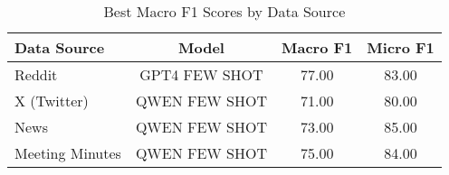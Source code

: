 \begin{table}[htbp]
\centering
\centering\caption{Best Macro F1 Scores by Data Source}
\label{tab:best_macro_f1_scores}
\begin{tabular}{lccc}
\toprule
Data Source & Model & Macro F1 & Micro F1 \\
\midrule
Reddit & GPT4 FEW SHOT & 77.00 & 83.00 \\
X (Twitter) & QWEN FEW SHOT & 71.00 & 80.00 \\
News & QWEN FEW SHOT & 73.00 & 85.00 \\
Meeting Minutes & QWEN FEW SHOT & 75.00 & 84.00 \\
\bottomrule
\end{tabular}
\end{table}